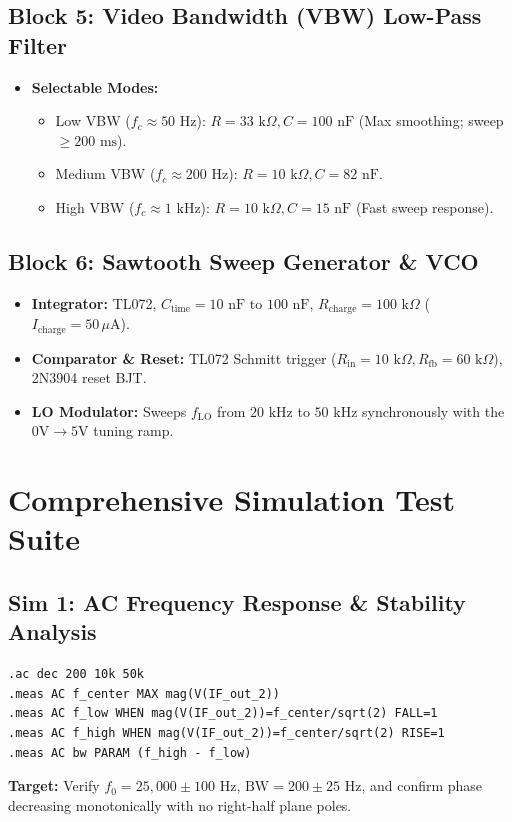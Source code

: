\documentclass[11pt,a4paper]{article}
\begin{document}
\subsection{Block 5: Video Bandwidth (VBW) Low-Pass Filter}
\begin{itemize}[leftmargin=*]
    \item \textbf{Selectable Modes:} 
    \begin{itemize}
        \item Low VBW ($f_c \approx 50\text{ Hz}$): $R = 33\text{ k}\Omega, C = 100\text{ nF}$ (Max smoothing; sweep $\ge 200\text{ ms}$).
        \item Medium VBW ($f_c \approx 200\text{ Hz}$): $R = 10\text{ k}\Omega, C = 82\text{ nF}$.
        \item High VBW ($f_c \approx 1\text{ kHz}$): $R = 10\text{ k}\Omega, C = 15\text{ nF}$ (Fast sweep response).
    \end{itemize}
\end{itemize}

\subsection{Block 6: Sawtooth Sweep Generator \& VCO}
\begin{itemize}[leftmargin=*]
    \item \textbf{Integrator:} TL072, $C_{\text{time}} = 10\text{ nF}\text{ to } 100\text{ nF}$, $R_{\text{charge}} = 100\text{ k}\Omega$ ($I_{\text{charge}} = 50\,\mu\text{A}$).
    \item \textbf{Comparator \& Reset:} TL072 Schmitt trigger ($R_{\text{in}} = 10\text{ k}\Omega, R_{\text{fb}} = 60\text{ k}\Omega$), 2N3904 reset BJT.
    \item \textbf{LO Modulator:} Sweeps $f_{\text{LO}}$ from $20\text{ kHz}$ to $50\text{ kHz}$ synchronously with the $0\text{V} \to 5\text{V}$ tuning ramp.
\end{itemize}

\section{Comprehensive Simulation Test Suite}

\subsection{Sim 1: AC Frequency Response \& Stability Analysis}
\begin{lstlisting}
.ac dec 200 10k 50k
.meas AC f_center MAX mag(V(IF_out_2))
.meas AC f_low WHEN mag(V(IF_out_2))=f_center/sqrt(2) FALL=1
.meas AC f_high WHEN mag(V(IF_out_2))=f_center/sqrt(2) RISE=1
.meas AC bw PARAM (f_high - f_low)
\end{lstlisting}
\textbf{Target:} Verify $f_0 = 25,000 \pm 100\text{ Hz}$, $\text{BW} = 200 \pm 25\text{ Hz}$, and confirm phase decreasing monotonically with no right-half plane poles.
\end{document}
